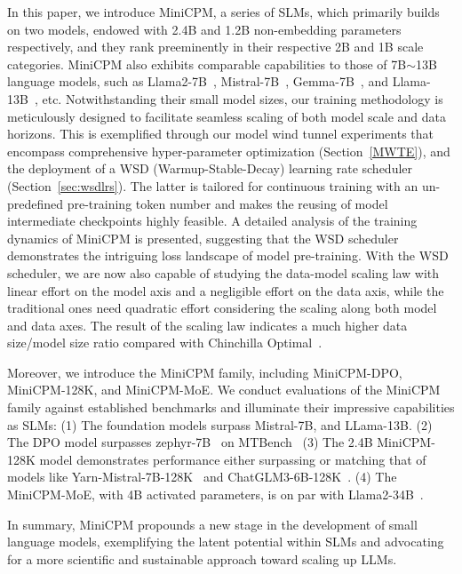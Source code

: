 In this paper, we introduce MiniCPM, a series of SLMs, which primarily builds on two models, endowed with 2.4B and 1.2B non-embedding parameters respectively, and they rank preeminently in their respective 2B and 1B scale categories. MiniCPM also exhibits comparable capabilities to those of 7B$\sim$13B language models, such as Llama2-7B~\citep{touvron2023llama}, Mistral-7B~\citep{jiang2023mistral}, Gemma-7B~\citep{Banks2024Gemma}, and Llama-13B~\citep{touvron2023llama}, etc.  Notwithstanding their small model sizes, our training methodology is meticulously designed to facilitate seamless scaling of both model scale and data horizons. This is exemplified through our model wind tunnel experiments that encompass comprehensive hyper-parameter optimization (Section~\ref{MWTE}), and the deployment of a WSD (Warmup-Stable-Decay) learning rate scheduler (Section~\ref{sec:wsdlrs}). The latter is tailored for continuous training with an un-predefined pre-training token number and makes the reusing of model intermediate checkpoints highly feasible. A detailed analysis of the training dynamics of MiniCPM is presented, suggesting that the WSD scheduler demonstrates the intriguing loss landscape of model pre-training. With the WSD scheduler, we are now also capable of studying the data-model scaling law with linear effort on the model axis and a negligible effort on the data axis, while the traditional ones need quadratic effort considering the scaling along both model and data axes. The result of the scaling law indicates a much higher data size/model size ratio compared with Chinchilla Optimal~\citep{hoffmann2022training}.

Moreover, we introduce the MiniCPM family, including MiniCPM-DPO, MiniCPM-128K, and MiniCPM-MoE. We conduct evaluations of the MiniCPM family against established benchmarks and illuminate their impressive capabilities as SLMs: (1) The foundation models surpass Mistral-7B, and LLama-13B. (2) The DPO model surpasses zephyr-7B~\citep{tunstall2023zephyr} on MTBench~\citep{zheng2024judging} (3) The 2.4B MiniCPM-128K model demonstrates performance either surpassing or matching that of models like Yarn-Mistral-7B-128K~\citep{peng2023yarn} and ChatGLM3-6B-128K~\citep{du2021glm}. (4) The MiniCPM-MoE, with 4B activated parameters, is on par with Llama2-34B~\citep{touvron2023llama}.

In summary, MiniCPM propounds a new stage in the development of small language models, exemplifying the latent potential within SLMs and advocating for a more scientific and sustainable approach toward scaling up LLMs. 











